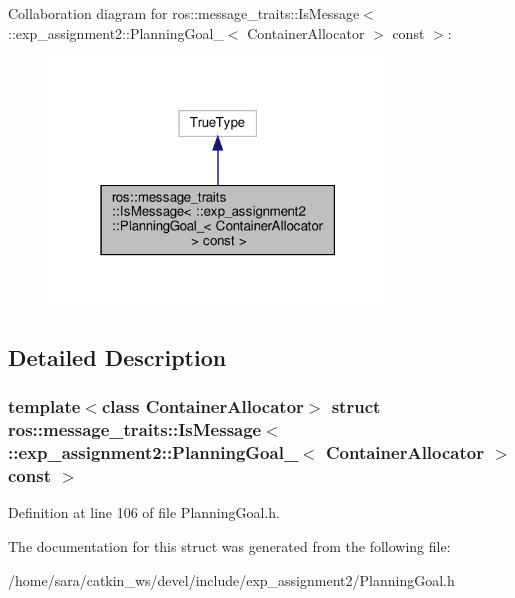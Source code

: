 Collaboration diagram for ros\+:\+:message\+\_\+traits\+:\+:Is\+Message$<$ \+:\+:exp\+\_\+assignment2\+:\+:Planning\+Goal\+\_\+$<$ Container\+Allocator $>$ const $>$\+:
\nopagebreak
\begin{figure}[H]
\begin{center}
\leavevmode
\includegraphics[width=255pt]{structros_1_1message__traits_1_1IsMessage_3_01_1_1exp__assignment2_1_1PlanningGoal___3_01Contain73f3297386fcf0611489a2ea47503694}
\end{center}
\end{figure}


\subsection{Detailed Description}
\subsubsection*{template$<$class Container\+Allocator$>$\newline
struct ros\+::message\+\_\+traits\+::\+Is\+Message$<$ \+::exp\+\_\+assignment2\+::\+Planning\+Goal\+\_\+$<$ Container\+Allocator $>$ const $>$}



Definition at line 106 of file Planning\+Goal.\+h.



The documentation for this struct was generated from the following file\+:\begin{DoxyCompactItemize}
\item 
/home/sara/catkin\+\_\+ws/devel/include/exp\+\_\+assignment2/Planning\+Goal.\+h\end{DoxyCompactItemize}
